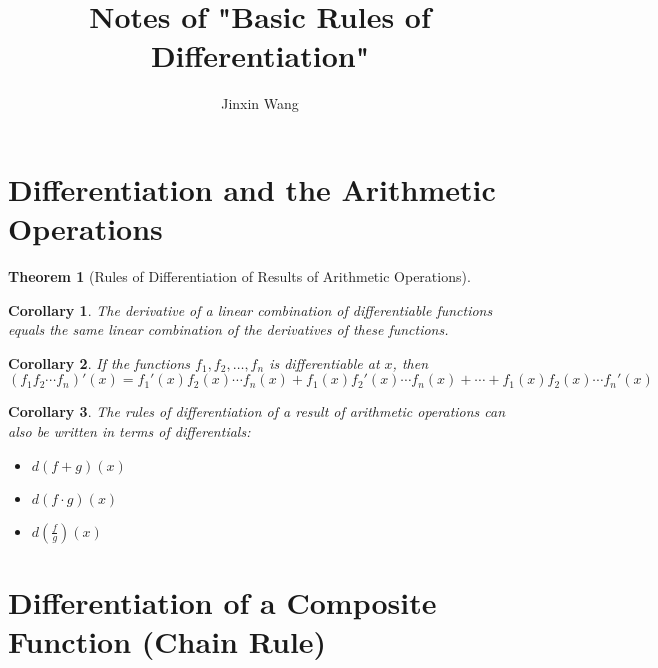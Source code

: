 \documentclass[onecolumn]{ctexart}
\title{Notes of "Basic Rules of Differentiation"}
\author{Jinxin Wang}
\date{}
\newtheorem{theorem}{Theorem}
\newtheorem{corollary}{Corollary}
\begin{document}
\maketitle

\section{Differentiation and the Arithmetic Operations}

\begin{theorem}[Rules of Differentiation of Results of Arithmetic Operations]
  
\end{theorem}

\begin{corollary}
  The derivative of a linear combination of differentiable functions equals the 
  same linear combination of the derivatives of these functions.
\end{corollary}

\begin{corollary}
  If the functions $f_1, f_2, \ldots, f_n$ is differentiable at $x$, then
  \[
    (f_1f_2 \cdots f_n)'(x) = f_1'(x)f_2(x) \cdots f_n(x) + f_1(x)f_2'(x) \cdots f_n(x) + \cdots + f_1(x)f_2(x) \cdots f_n'(x)
  \]
\end{corollary}

\begin{corollary}
  The rules of differentiation of a result of arithmetic operations can also be 
  written in terms of differentials:
  \begin{itemize}
    \item $d(f + g)(x)$
    \item $d(f \cdot g)(x)$
    \item $d(\frac{f}{g})(x)$
  \end{itemize}
\end{corollary}

\section{Differentiation of a Composite Function (Chain Rule)}
\end{document}

